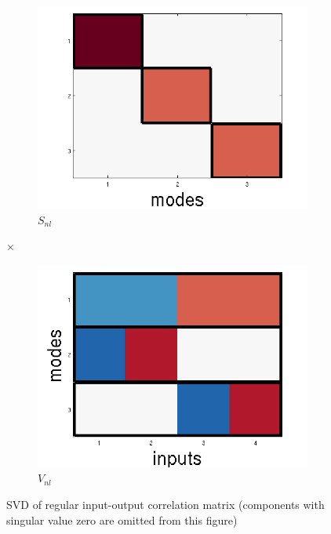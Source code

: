 \documentclass[10pt,letterpaper]{article}
\begin{document}
\begin{figure}
\begin{subfigure}{0.22\textwidth}
\includegraphics[width=\textwidth]{figures/S_nl.png}
\caption{$S_{nl}$}
\end{subfigure}
\LARGE{$\times$}
\begin{subfigure}{0.22\textwidth}
\includegraphics[width=\textwidth]{figures/V_nl.png}
\caption{$V_{nl}$}
\end{subfigure}
\caption{SVD of regular input-output correlation matrix (components with singular value zero are omitted from this figure)}
\label{regular_SVD_figure}
\end{figure}
\end{document}
